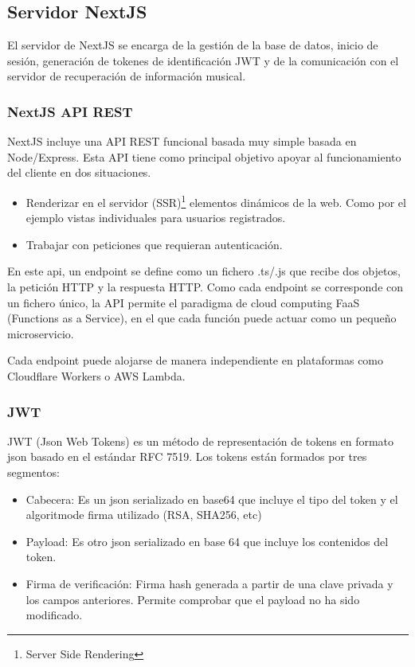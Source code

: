 \hypertarget{backend-nextjs}{%
\subsection{Servidor NextJS}\label{backend-nextjs}}
El servidor de NextJS se encarga de la gestión de la base de datos, inicio de sesión, generación de tokenes de identificación JWT y de la comunicación con el servidor de recuperación de información musical. 

\hypertarget{nextjs-api-rest}{%
\subsubsection{NextJS API REST}\label{nextjs-api-rest}}

NextJS incluye una API REST funcional basada muy simple basada en
Node/Express. Esta API tiene como principal objetivo apoyar al
funcionamiento del cliente en dos situaciones.

\begin{itemize}
\item
  Renderizar en el servidor (SSR)\footnote{Server Side Rendering} elementos dinámicos de la web. Como
  por el ejemplo vistas individuales para usuarios registrados.
\item
  Trabajar con peticiones que requieran autenticación.
\end{itemize}

En este api, un endpoint se define como un fichero .ts/.js que recibe
dos objetos, la petición HTTP y la respuesta HTTP. Como cada endpoint se
corresponde con un fichero único, la API permite el paradigma de cloud
computing FaaS (Functions as a Service), en el que cada función puede
actuar como un pequeño microservicio.

Cada endpoint puede alojarse de manera independiente en plataformas
como Cloudflare Workers o AWS Lambda.

\hypertarget{jwt}{%
\subsubsection{JWT}\label{jwt}}

JWT (Json Web Tokens) es un método de representación de tokens en
formato json basado en el estándar RFC 7519. Los tokens están formados
por tres segmentos:

\begin{itemize}
\item
  Cabecera: Es un json serializado en base64 que incluye el tipo del
  token y el algoritmode firma utilizado (RSA, SHA256, etc)
\item
  Payload: Es otro json serializado en base 64 que incluye los
  contenidos del token.
\item
  Firma de verificación: Firma hash generada a partir de una clave
  privada y los campos anteriores. Permite comprobar que el payload no
  ha sido modificado.
\end{itemize}

